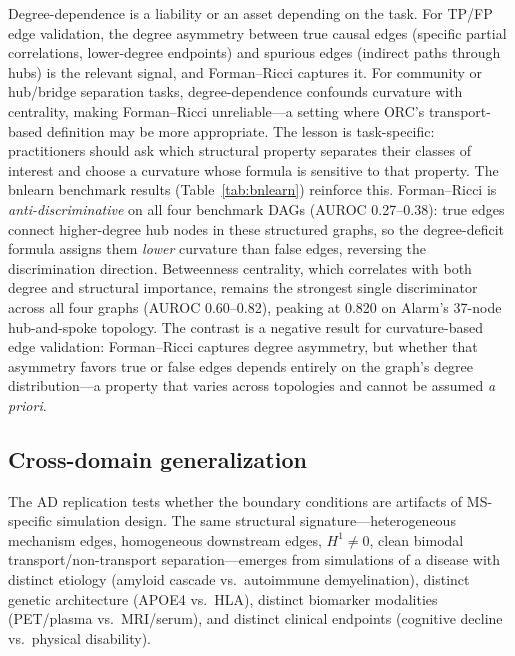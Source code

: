 \documentclass{article}
\begin{document}
Degree-dependence is a liability or an asset depending on the task.
For TP/FP edge validation, the degree asymmetry between true causal edges (specific partial correlations, lower-degree endpoints) and spurious edges (indirect paths through hubs) is the relevant signal, and Forman--Ricci captures it.
For community or hub/bridge separation tasks, degree-dependence confounds curvature with centrality, making Forman--Ricci unreliable---a setting where ORC's transport-based definition may be more appropriate.
The lesson is task-specific: practitioners should ask which structural property separates their classes of interest and choose a curvature whose formula is sensitive to that property.
The bnlearn benchmark results (Table~\ref{tab:bnlearn}) reinforce this.
Forman--Ricci is \emph{anti-discriminative} on all four benchmark DAGs (AUROC 0.27--0.38): true edges connect higher-degree hub nodes in these structured graphs, so the degree-deficit formula assigns them \emph{lower} curvature than false edges, reversing the discrimination direction.
Betweenness centrality, which correlates with both degree and structural importance, remains the strongest single discriminator across all four graphs (AUROC 0.60--0.82), peaking at 0.820 on Alarm's 37-node hub-and-spoke topology.
The contrast is a negative result for curvature-based edge validation: Forman--Ricci captures degree asymmetry, but whether that asymmetry favors true or false edges depends entirely on the graph's degree distribution---a property that varies across topologies and cannot be assumed \emph{a priori}.

\subsection{Cross-domain generalization}

The AD replication tests whether the boundary conditions are artifacts of MS-specific simulation design.
The same structural signature---heterogeneous mechanism edges, homogeneous downstream edges, $H^1 \neq 0$, clean bimodal transport/non-transport separation---emerges from simulations of a disease with distinct etiology (amyloid cascade vs.\ autoimmune demyelination), distinct genetic architecture (APOE4 vs.\ HLA), distinct biomarker modalities (PET/plasma vs.\ MRI/serum), and distinct clinical endpoints (cognitive decline vs.\ physical disability).
\end{document}

